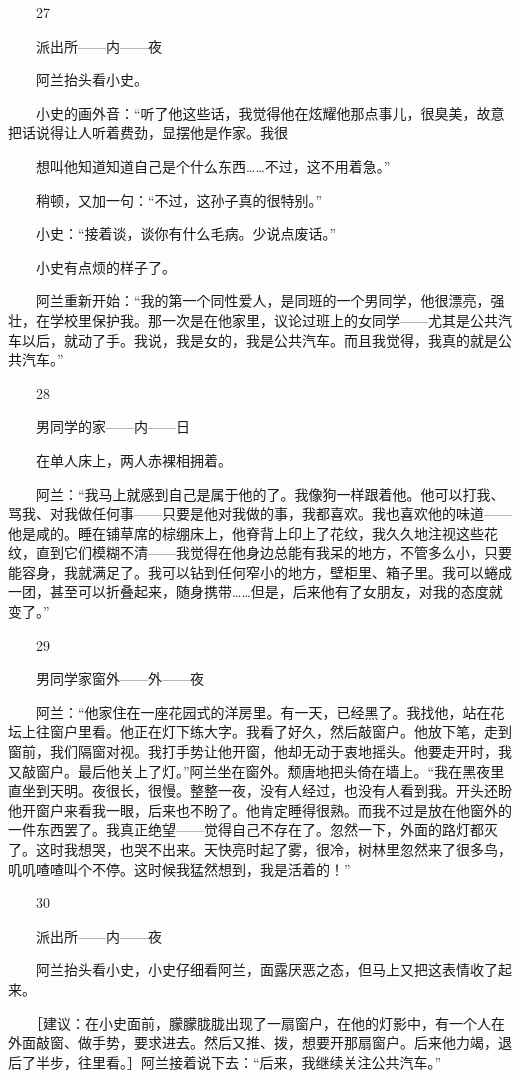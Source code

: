 　　27 

　　派出所——内——夜 

　　阿兰抬头看小史。 

　　小史的画外音：“听了他这些话，我觉得他在炫耀他那点事儿，很臭美，故意把话说得让人听着费劲，显摆他是作家。我很 

　　想叫他知道知道自己是个什么东西……不过，这不用着急。” 

　　稍顿，又加一句：“不过，这孙子真的很特别。” 

　　小史：“接着谈，谈你有什么毛病。少说点废话。” 

　　小史有点烦的样子了。 

　　阿兰重新开始：“我的第一个同性爱人，是同班的一个男同学，他很漂亮，强壮，在学校里保护我。那一次是在他家里，议论过班上的女同学——尤其是公共汽车以后，就动了手。我说，我是女的，我是公共汽车。而且我觉得，我真的就是公共汽车。” 

　　28 

　　男同学的家——内——日 

　　在单人床上，两人赤裸相拥着。 

　　阿兰：“我马上就感到自己是属于他的了。我像狗一样跟着他。他可以打我、骂我、对我做任何事——只要是他对我做的事，我都喜欢。我也喜欢他的味道——他是咸的。睡在铺草席的棕绷床上，他脊背上印上了花纹，我久久地注视这些花纹，直到它们模糊不清——我觉得在他身边总能有我呆的地方，不管多么小，只要能容身，我就满足了。我可以钻到任何窄小的地方，壁柜里、箱子里。我可以蜷成一团，甚至可以折叠起来，随身携带……但是，后来他有了女朋友，对我的态度就变了。” 

　　29 

　　男同学家窗外——外——夜 

　　阿兰：“他家住在一座花园式的洋房里。有一天，已经黑了。我找他，站在花坛上往窗户里看。他正在灯下练大字。我看了好久，然后敲窗户。他放下笔，走到窗前，我们隔窗对视。我打手势让他开窗，他却无动于衷地摇头。他要走开时，我又敲窗户。最后他关上了灯。”阿兰坐在窗外。颓唐地把头倚在墙上。“我在黑夜里直坐到天明。夜很长，很慢。整整一夜，没有人经过，也没有人看到我。开头还盼他开窗户来看我一眼，后来也不盼了。他肯定睡得很熟。而我不过是放在他窗外的一件东西罢了。我真正绝望——觉得自己不存在了。忽然一下，外面的路灯都灭了。这时我想哭，也哭不出来。天快亮时起了雾，很冷，树林里忽然来了很多鸟，叽叽喳喳叫个不停。这时候我猛然想到，我是活着的！” 

　　30 

　　派出所——内——夜 

　　阿兰抬头看小史，小史仔细看阿兰，面露厌恶之态，但马上又把这表情收了起来。 

　　［建议：在小史面前，朦朦胧胧出现了一扇窗户，在他的灯影中，有一个人在外面敲窗、做手势，要求进去。然后又推、拨，想要开那扇窗户。后来他力竭，退后了半步，往里看。］阿兰接着说下去：“后来，我继续关注公共汽车。”
